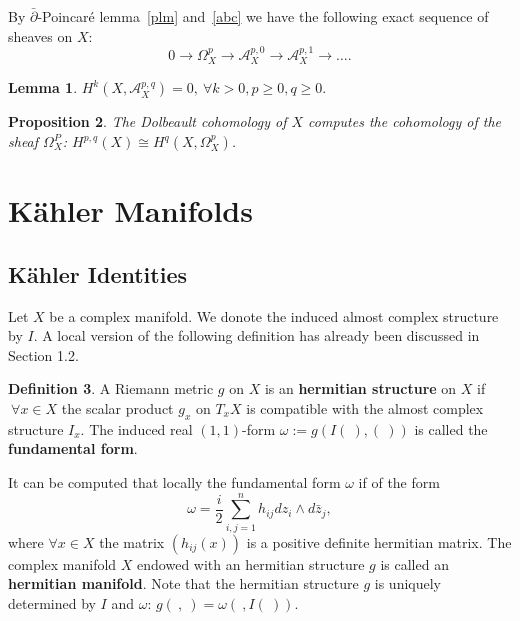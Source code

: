 \documentclass{article}
\theoremstyle{definition}
\newtheorem{definition}{Definition}[subsection]
\theoremstyle{plain}
\newtheorem{lemma}[definition]{Lemma}
\newtheorem{proposition}[definition]{Proposition}
\begin{document}
By $ \bar{\partial} $-Poincar\'{e} lemma~\ref{plm} and~\ref{abc} we have the following exact sequence of sheaves on $ X $:\[
    0\longrightarrow\varOmega^{p}_X\longrightarrow\mathcal{A}^{p,0}_X\longrightarrow\mathcal{A}^{p,1}_X\longrightarrow\dots.
\]

\begin{lemma}
    $ H^k(X,\mathcal{A}^{p,q}_X)=0,\ \forall k>0,p\geqslant 0,q\geqslant 0. $
\end{lemma}

\begin{proposition}
    The Dolbeault cohomology of $ X $ computes the cohomology of the sheaf $ \varOmega^P_X $: $ H^{p,q}(X)\cong H^q(X,\varOmega^p_X) $.
\end{proposition}

\section{K\"{a}hler Manifolds}

\subsection{K\"{a}hler Identities}

Let $ X $ be a complex manifold. We donote the induced almost complex structure by $ I $. A local version of the following definition has already been discussed in Section 1.2.

\begin{definition}
    A Riemann metric $ g $ on $ X $ is an \textbf{hermitian structure} on $ X $ if $ \ \forall x\in X $ the scalar product $ g_x $ on $ T_x X $ is compatible with the almost complex structure $ I_x $. The induced real $ (1,1) $-form $ \omega:=g(I(\ ),(\ )) $ is called the \textbf{fundamental form}.
\end{definition}

It can be computed that locally the fundamental form $ \omega $ if of the form\[
    \omega=\frac{i}{2}\sum_{i,j=1}^n h_{ij}dz_i\wedge d\bar{z}_j,
\]where $ \forall x\in X $ the matrix $ (h_{ij}(x)) $ is a positive definite hermitian matrix. The complex manifold $ X $ endowed with an hermitian structure $ g $ is called an \textbf{hermitian manifold}. Note that the hermitian structure $ g $ is uniquely determined by $ I $ and $ \omega $: $ g(\ ,\ )=\omega(\ ,I(\ )) $.
\end{document}
